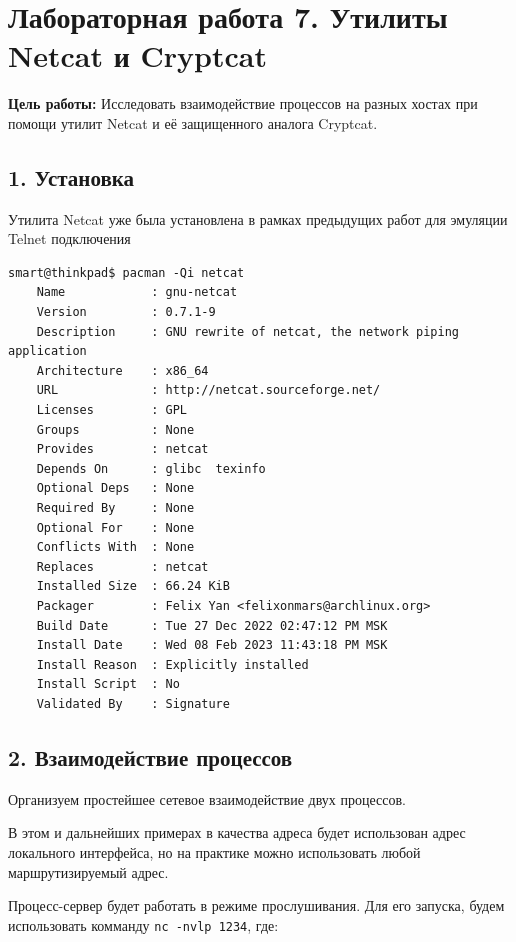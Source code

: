 \chapter*{Лабораторная работа 7. Утилиты Netcat и Cryptcat}

\textbf{Цель работы:} Исследовать взаимодействие процессов на разных хостах при помощи утилит Netcat и её защищенного аналога Cryptcat.

\section*{1. Установка}

Утилита Netcat уже была установлена в рамках предыдущих работ для эмуляции Telnet подключения
\begin{Verbatim}[frame=single,breaklines=true,breakanywhere=true]
    smart@thinkpad$ pacman -Qi netcat
    Name            : gnu-netcat
    Version         : 0.7.1-9
    Description     : GNU rewrite of netcat, the network piping application
    Architecture    : x86_64
    URL             : http://netcat.sourceforge.net/
    Licenses        : GPL
    Groups          : None
    Provides        : netcat
    Depends On      : glibc  texinfo
    Optional Deps   : None
    Required By     : None
    Optional For    : None
    Conflicts With  : None
    Replaces        : netcat
    Installed Size  : 66.24 KiB
    Packager        : Felix Yan <felixonmars@archlinux.org>
    Build Date      : Tue 27 Dec 2022 02:47:12 PM MSK
    Install Date    : Wed 08 Feb 2023 11:43:18 PM MSK
    Install Reason  : Explicitly installed
    Install Script  : No
    Validated By    : Signature
\end{Verbatim}

\section*{2. Взаимодействие процессов}

Организуем простейшее сетевое взаимодействие двух процессов.

В этом и дальнейших примерах в качества адреса будет использован адрес локального интерфейса, но на практике можно использовать любой маршрутизируемый адрес.

Процесс-сервер будет работать в режиме прослушивания. Для его запуска, будем использовать комманду \texttt{nc -nvlp 1234}, где:

